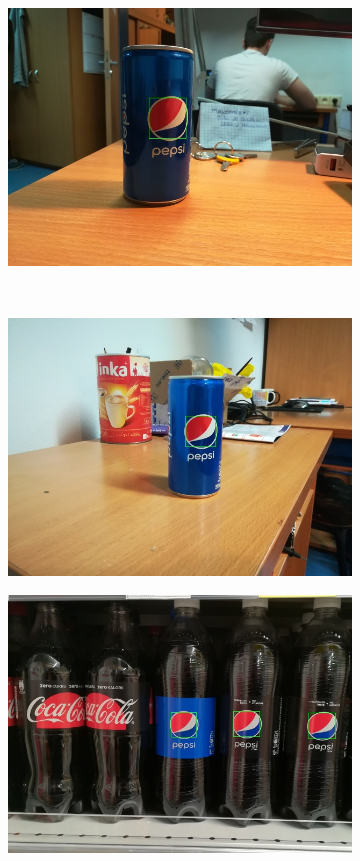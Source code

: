 \documentclass[11pt,a4paper,twoside]{report}
\begin{document}
\begin{figure}
\begin{subfigure}[b]{0.48\textwidth}
	        \includegraphics[width=\textwidth]{img/camera/2}
	    \end{subfigure}
	    ~
	    \begin{subfigure}[b]{0.48\textwidth}
	        \includegraphics[width=\textwidth]{img/camera/3}
	    \end{subfigure}
	    \begin{subfigure}[b]{0.48\textwidth}
	        \includegraphics[width=\textwidth]{img/camera/4}

\end{subfigure}
\end{figure}
\end{document}
